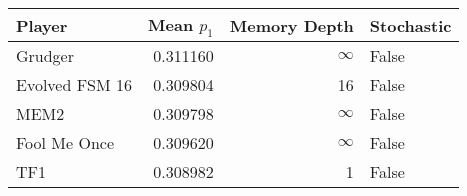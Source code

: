 \begin{tabular}{lrrl}
\toprule
         Player &  Mean $p_1$ &  Memory Depth & Stochastic \\
\midrule
        Grudger &    0.311160 &            \(\infty\) &      False \\
 Evolved FSM 16 &    0.309804 &            16 &      False \\
           MEM2 &    0.309798 &            \(\infty\) &      False \\
   Fool Me Once &    0.309620 &            \(\infty\) &      False \\
            TF1 &    0.308982 &             1 &      False \\
\bottomrule
\end{tabular}
